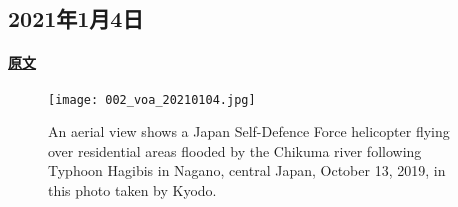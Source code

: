 \subsection{2021年1月4日}
\paragraph{\href{https://www.51voa.com/VOA\_Special\_English/scientists-declare-climate-emergency-83245.html}{原文}}

\begin{figure}[H]
\centering
\texttt{[image: 002\_voa\_20210104.jpg]}
\caption{An aerial view shows a Japan Self-Defence Force helicopter flying over residential areas flooded by the Chikuma river following Typhoon Hagibis in Nagano, central Japan, October 13, 2019, in this photo taken by Kyodo.}
\end{figure}

